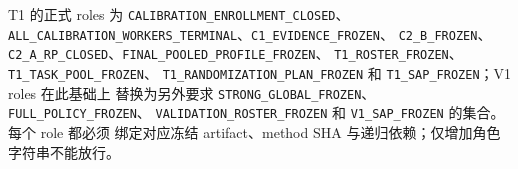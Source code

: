 T1 的正式 roles 为 \texttt{CALIBRATION\_ENROLLMENT\_CLOSED}、
\texttt{ALL\_CALIBRATION\_WORKERS\_TERMINAL}、\texttt{C1\_EVIDENCE\_FROZEN}、
\texttt{C2\_B\_FROZEN}、\texttt{C2\_A\_RP\_CLOSED}、\texttt{FINAL\_POOLED\_PROFILE\_FROZEN}、
\texttt{T1\_ROSTER\_FROZEN}、\texttt{T1\_TASK\_POOL\_FROZEN}、
\texttt{T1\_RANDOMIZATION\_PLAN\_FROZEN} 和 \texttt{T1\_SAP\_FROZEN}；V1 roles 在此基础上
替换为另外要求 \texttt{STRONG\_GLOBAL\_FROZEN}、\texttt{FULL\_POLICY\_FROZEN}、
\texttt{VALIDATION\_ROSTER\_FROZEN} 和 \texttt{V1\_SAP\_FROZEN} 的集合。每个 role 都必须
绑定对应冻结 artifact、method SHA 与递归依赖；仅增加角色字符串不能放行。
